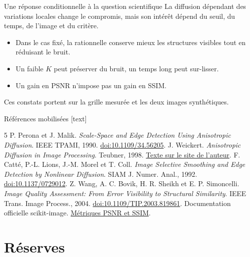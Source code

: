 \documentclass[aspectratio=169,11pt]{beamer}
\newcommand{\sectionlabel}{Projet de Master}
\newcommand{\smallgap}{\vspace{0.18cm}}
\begin{document}
\begin{frame}[label=conclusion]{Une réponse conditionnelle à la question scientifique}
  \large
  La diffusion dépendant des variations locales change le compromis,
  mais son intérêt dépend du seuil, du temps, de l'image et du critère.
  \smallgap
  \normalsize
  \begin{itemize}
    \item Dans le cas fixé, la rationnelle conserve mieux les structures
      visibles tout en réduisant le bruit.
    \item Un faible $K$ peut préserver du bruit, un temps long peut sur-lisser.
    \item Un gain en PSNR n'impose pas un gain en SSIM.
  \end{itemize}
  \smallgap
  Ces constats portent sur la grille mesurée et les deux images synthétiques.
\end{frame}

\renewcommand{\sectionlabel}{Références}
\begin{frame}[label=references]{Références mobilisées}
  \footnotesize
  [text]
  \begin{thebibliography}{5}
     P. Perona et J. Malik.
      \emph{Scale-Space and Edge Detection Using Anisotropic Diffusion}.
      IEEE TPAMI, 1990.
      \href{https://doi.org/10.1109/34.56205}{doi:10.1109/34.56205}.
     J. Weickert.
      \emph{Anisotropic Diffusion in Image Processing}.
      Teubner, 1998.
      \href{https://www.mia.uni-saarland.de/weickert/book.html}{Texte sur le site de l'auteur}.
     F. Catté, P.-L. Lions, J.-M. Morel et T. Coll.
      \emph{Image Selective Smoothing and Edge Detection by Nonlinear Diffusion}.
      SIAM J. Numer. Anal., 1992.
      \href{https://doi.org/10.1137/0729012}{doi:10.1137/0729012}.
     Z. Wang, A. C. Bovik, H. R. Sheikh et E. P. Simoncelli.
      \emph{Image Quality Assessment: From Error Visibility to Structural Similarity}.
      IEEE Trans. Image Process., 2004.
      \href{https://doi.org/10.1109/TIP.2003.819861}{doi:10.1109/TIP.2003.819861}.
     Documentation officielle scikit-image.
      \href{https://scikit-image.org/docs/stable/api/skimage.metrics.html}{Métriques PSNR et SSIM}.
  \end{thebibliography}
\end{frame}

\appendix
\section{Réserves}
\end{document}
